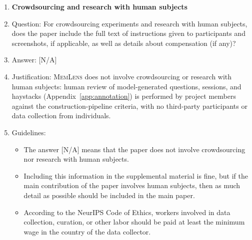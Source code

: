 \documentclass{llmxive}
\providecommand{\bench}{\textsc{MemLens}}
\providecommand{\answerNA}[1][]{[N/A]#1}
\begin{document}
\begin{enumerate}
\item {\bf Crowdsourcing and research with human subjects}
    \item[] Question: For crowdsourcing experiments and research with human subjects, does the paper include the full text of instructions given to participants and screenshots, if applicable, as well as details about compensation (if any)?
    \item[] Answer: \answerNA{}
    \item[] Justification: \bench{} does not involve crowdsourcing or research with human subjects: human review of model-generated questions, sessions, and haystacks (Appendix~\ref{app:annotation}) is performed by project members against the construction-pipeline criteria, with no third-party participants or data collection from individuals.
    \item[] Guidelines:
    \begin{itemize}
        \item The answer \answerNA{} means that the paper does not involve crowdsourcing nor research with human subjects.
        \item Including this information in the supplemental material is fine, but if the main contribution of the paper involves human subjects, then as much detail as possible should be included in the main paper.
        \item According to the NeurIPS Code of Ethics, workers involved in data collection, curation, or other labor should be paid at least the minimum wage in the country of the data collector.
    \end{itemize}


\end{enumerate}
\end{document}
